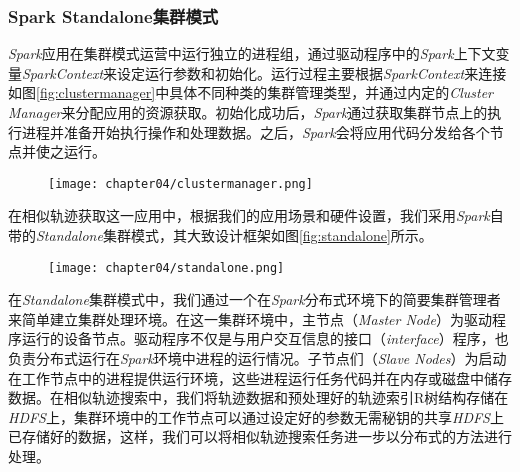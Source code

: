 \subsubsection{Spark Standalone集群模式}
\label{subsubsec:standalone}
\emph{Spark}应用在集群模式运营中运行独立的进程组，通过驱动程序中的\emph{Spark}上下文变量\emph{SparkContext}来设定运行参数和初始化。运行过程主要根据\emph{SparkContext}来连接如图\ref{fig:clustermanager}\cite{sparkclustermanager}中具体不同种类的集群管理类型，并通过内定的\emph{Cluster Manager}来分配应用的资源获取。初始化成功后，\emph{Spark}通过获取集群节点上的执行进程并准备开始执行操作和处理数据。之后，\emph{Spark}会将应用代码分发给各个节点并使之运行。

\begin{figure}[!htp]
  \centering
  \texttt{[image: chapter04/clustermanager.png]}
\end{figure}

在相似轨迹获取这一应用中，根据我们的应用场景和硬件设置，我们采用\emph{Spark}自带的\emph{Standalone}集群模式，其大致设计框架如图\ref{fig:standalone}\cite{hongzhi2017parallel}所示。

\begin{figure}[!htp]
  \centering
  \texttt{[image: chapter04/standalone.png]}
\end{figure}

在\emph{Standalone}集群模式中，我们通过一个在\emph{Spark}分布式环境下的简要集群管理者来简单建立集群处理环境。在这一集群环境中，主节点（\emph{Master Node}）为驱动程序运行的设备节点。驱动程序不仅是与用户交互信息的接口（\emph{interface}）程序，也负责分布式运行在\emph{Spark}环境中进程的运行情况。子节点们（\emph{Slave Nodes}）为启动在工作节点中的进程提供运行环境，这些进程运行任务代码并在内存或磁盘中储存数据。在相似轨迹搜索中，我们将轨迹数据和预处理好的轨迹索引R树结构存储在\emph{HDFS}上，集群环境中的工作节点可以通过设定好的参数无需秘钥的共享\emph{HDFS}上已存储好的数据，这样，我们可以将相似轨迹搜索任务进一步以分布式的方法进行处理。


